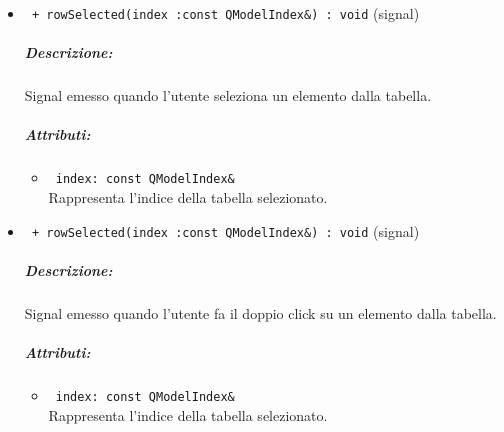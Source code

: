 \begin{itemize}
\item\color{blue}\verb! + rowSelected(index :const QModelIndex&) : void! (signal)
\color{black} 
\subparagraph{Descrizione:} 
Signal\g{} emesso quando l'utente seleziona un elemento dalla tabella.
\subparagraph{Attributi:}
\begin{itemize}
\item \color{RoyalPurple}\verb! index: const QModelIndex& ! \\ Rappresenta l'indice della tabella selezionato.
\end{itemize}

\item\color{blue}\verb! + rowSelected(index :const QModelIndex&) : void! (signal)
\color{black} 
\subparagraph{Descrizione:} 
Signal\g{} emesso quando l'utente fa il doppio click su un elemento dalla tabella.
\subparagraph{Attributi:}
\begin{itemize}
\item \color{RoyalPurple}\verb! index: const QModelIndex& ! \\ Rappresenta l'indice della tabella selezionato.
\end{itemize}

\end{itemize}
\color{black}